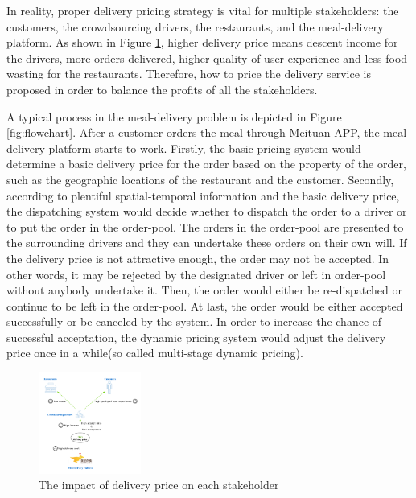 \documentclass[sigconf,authordraft]{acmart}
\begin{document}
In reality, proper delivery pricing strategy is vital for multiple stakeholders: the customers, the crowdsourcing drivers, the restaurants, and the meal-delivery platform. As shown in Figure \ref{fig:profit}, higher delivery price means descent income for the drivers, more orders delivered, higher quality of user experience and less food wasting for the restaurants. Therefore, how to price the delivery service is proposed in order to balance the profits of all the stakeholders. 

A typical process in the meal-delivery problem is depicted in Figure \ref{fig:flowchart}. After a customer orders the meal through Meituan APP, the meal-delivery platform starts to work. Firstly, the basic pricing system would determine a basic delivery price for the order based on the property of the order, such as the geographic locations of the restaurant and the customer. Secondly, according to plentiful spatial-temporal information and the basic delivery price, the dispatching system would decide whether to dispatch the order to a driver or to put the order in the order-pool. The orders in the order-pool are presented to the surrounding drivers and they can undertake these orders on their own will. If the delivery price is not attractive enough, the order may not be accepted. In other words, it may be rejected by the designated driver or left in order-pool without anybody undertake it. Then, the order would either be re-dispatched or continue to be left in the order-pool. At last, the order would be either accepted successfully or be canceled by the system. In order to increase the chance of successful acceptation, the dynamic pricing system would adjust the delivery price once in a while(so called multi-stage dynamic pricing). 
 \begin{figure}[h]
  \centering
  \includegraphics[width=0.3\textwidth]{profit.png}
  \caption{The impact of delivery price on each stakeholder}
  \label{fig:profit}
\end{figure}
\end{document}
